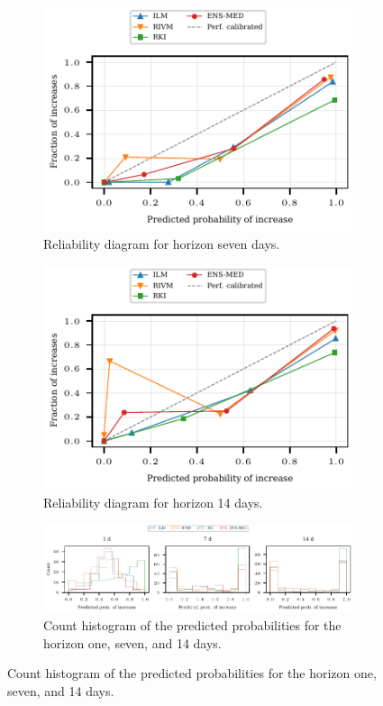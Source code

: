 \documentclass[pdflatex]{sn-jnl}
\theoremstyle{plain}%
\theoremstyle{definition}
\begin{document}
\begin{figure}
    \centering
    \begin{subfigure}[t]{.48\textwidth}
        \includegraphics{plots/covid_nowcast/60_reliability_diagram_lag_7}
        \caption{Reliability diagram for horizon seven days.} \label{fig:app-covid-reliability-7}
    \end{subfigure}\hfill
    \begin{subfigure}[t]{.48\textwidth}
        \includegraphics{plots/covid_nowcast/60_reliability_diagram_lag_14}
        \caption{Reliability diagram for horizon 14 days.} \label{fig:app-covid-reliability-14}
    \end{subfigure}
    \begin{subfigure}{\textwidth}
        \includegraphics{plots/covid_nowcast/70_prob_hist}
        \caption{Count histogram of the predicted probabilities for the horizon one, seven, and 14 days.} \label{fig:app-covid-prob-hist}

\end{subfigure}
\end{figure}
\end{document}

